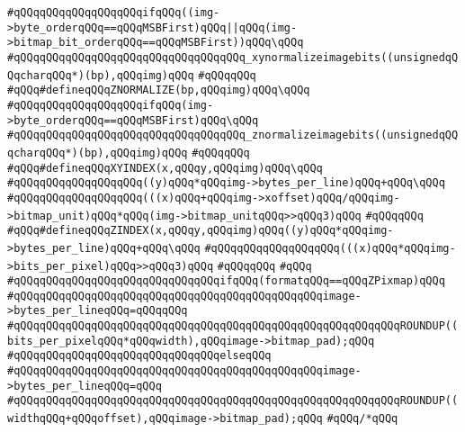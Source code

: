 \verb|#qQQqqQQqqQQqqQQqqQQqifqQQq((img->byte_orderqQQq==qQQqMSBFirst)qQQq|\verb#||qQQq(img->bitmap_bit_orderqQQq==qQQqMSBFirst))qQQq\qQQq#\newline
\verb|#qQQqqQQqqQQqqQQqqQQqqQQqqQQqqQQqqQQq_xynormalizeimagebits((unsignedqQQqcharqQQq*)(bp),qQQqimg)qQQq|\newline
\verb|#qQQqqQQq|\newline
\verb|#qQQq#defineqQQqZNORMALIZE(bp,qQQqimg)qQQq\qQQq|\newline
\verb|#qQQqqQQqqQQqqQQqqQQqifqQQq(img->byte_orderqQQq==qQQqMSBFirst)qQQq\qQQq|\newline
\verb|#qQQqqQQqqQQqqQQqqQQqqQQqqQQqqQQqqQQq_znormalizeimagebits((unsignedqQQqcharqQQq*)(bp),qQQqimg)qQQq|\newline
\verb|#qQQqqQQq|\newline
\verb|#qQQq#defineqQQqXYINDEX(x,qQQqy,qQQqimg)qQQq\qQQq|\newline
\verb|#qQQqqQQqqQQqqQQqqQQq((y)qQQq*qQQqimg->bytes_per_line)qQQq+qQQq\qQQq|\newline
\verb|#qQQqqQQqqQQqqQQqqQQq(((x)qQQq+qQQqimg->xoffset)qQQq/qQQqimg->bitmap_unit)qQQq*qQQq(img->bitmap_unitqQQq>>qQQq3)qQQq|\newline
\verb|#qQQqqQQq|\newline
\verb|#qQQq#defineqQQqZINDEX(x,qQQqy,qQQqimg)qQQq((y)qQQq*qQQqimg->bytes_per_line)qQQq+qQQq\qQQq|\newline
\verb|#qQQqqQQqqQQqqQQqqQQq(((x)qQQq*qQQqimg->bits_per_pixel)qQQq>>qQQq3)qQQq|\newline
\verb|#qQQqqQQq|\newline
\verb|#qQQq|\newline
\verb|#qQQqqQQqqQQqqQQqqQQqqQQqqQQqqQQqifqQQq(formatqQQq==qQQqZPixmap)qQQq|\newline
\verb|#qQQqqQQqqQQqqQQqqQQqqQQqqQQqqQQqqQQqqQQqqQQqqQQqimage->bytes_per_lineqQQq=qQQqqQQq|\newline
\verb|#qQQqqQQqqQQqqQQqqQQqqQQqqQQqqQQqqQQqqQQqqQQqqQQqqQQqqQQqqQQqROUNDUP((bits_per_pixelqQQq*qQQqwidth),qQQqimage->bitmap_pad);qQQq|\newline
\verb|#qQQqqQQqqQQqqQQqqQQqqQQqqQQqqQQqelseqQQq|\newline
\verb|#qQQqqQQqqQQqqQQqqQQqqQQqqQQqqQQqqQQqqQQqqQQqqQQqimage->bytes_per_lineqQQq=qQQq|\newline
\verb|#qQQqqQQqqQQqqQQqqQQqqQQqqQQqqQQqqQQqqQQqqQQqqQQqqQQqqQQqqQQqROUNDUP((widthqQQq+qQQqoffset),qQQqimage->bitmap_pad);qQQq|\newline
\verb|#qQQq/*qQQq|\newline
